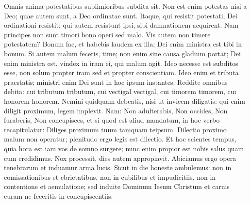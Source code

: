 \begin{biblechapter}
\begin{biblechapter}
\begin{biblechapter}
\begin{biblechapter}
\begin{biblechapter}
\begin{biblechapter}
\begin{biblechapter}
\begin{biblechapter}
\begin{biblechapter}
\begin{biblechapter}
\begin{biblechapter}
\begin{biblechapter}
\begin{biblechapter}
\verse Omnis anima potestatibus sublimioribus subdita sit. Non est enim potestas nisi a Deo; quae autem sunt, a Deo ordinatae sunt. 
\verse Itaque, qui resistit potestati, Dei ordinationi resistit; qui autem resistunt ipsi, sibi damnationem acquirent. 
\verse Nam principes non sunt timori bono operi sed malo. Vis autem non timere potestatem? Bonum fac, et habebis laudem ex illa; 
\verse Dei enim ministra est tibi in bonum. Si autem malum feceris, time; non enim sine causa gladium portat; Dei enim ministra est, vindex in iram ei, qui malum agit. 
\verse Ideo necesse est subditos esse, non solum propter iram sed et propter conscientiam. 
\verse Ideo enim et tributa praestatis; ministri enim Dei sunt in hoc ipsum instantes. 
\verse Reddite omnibus debita: cui tributum tributum, cui vectigal vectigal, cui timorem timorem, cui honorem honorem.
 \verse Nemini quidquam debeatis, nisi ut invicem diligatis: qui enim diligit proximum, legem implevit. 
\verse Nam: Non adulterabis, Non occides, Non furaberis, Non concupisces, et si quod est aliud mandatum, in hoc verbo recapitulatur: Diliges proximum tuum tamquam teipsum. 
\verse Dilectio proximo malum non operatur; plenitudo ergo legis est dilectio.
 \verse Et hoc scientes tempus, quia hora est iam vos de somno surgere; nunc enim propior est nobis salus quam cum credidimus. 
\verse Nox processit, dies autem appropiavit. Abiciamus ergo opera tenebrarum et induamur arma lucis. 
\verse Sicut in die honeste ambulemus: non in comissationibus et ebrietatibus, non in cubilibus et impudicitiis, non in contentione et aemulatione; 
\verse sed induite Dominum Iesum Christum et carnis curam ne feceritis in concupiscentiis.
 

\end{biblechapter}
\end{biblechapter}
\end{biblechapter}
\end{biblechapter}
\end{biblechapter}
\end{biblechapter}
\end{biblechapter}
\end{biblechapter}
\end{biblechapter}
\end{biblechapter}
\end{biblechapter}
\end{biblechapter}
\end{biblechapter}
